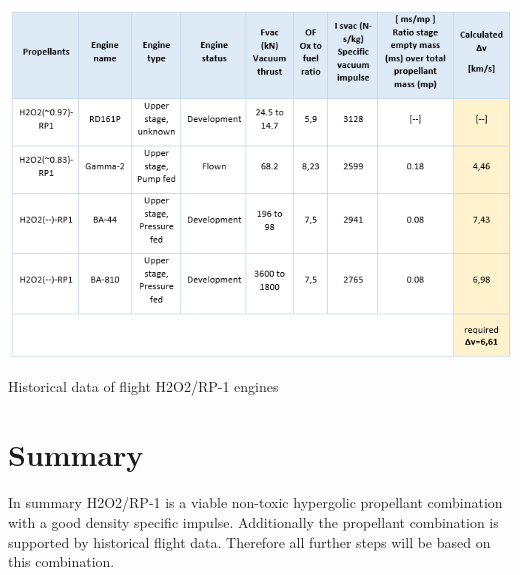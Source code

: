 \begin{table}
	\centering\includegraphics[width=\linewidth]{histflightprop}
	\caption{Historical data of flight H2O2/RP-1 engines}\label{tab3}
\end{table}
\section{Summary}

\qquad In summary H2O2/RP-1 is a viable non-toxic hypergolic propellant combination with a good density specific impulse. Additionally the propellant combination is supported by historical flight data. Therefore all further steps will be based on this combination.